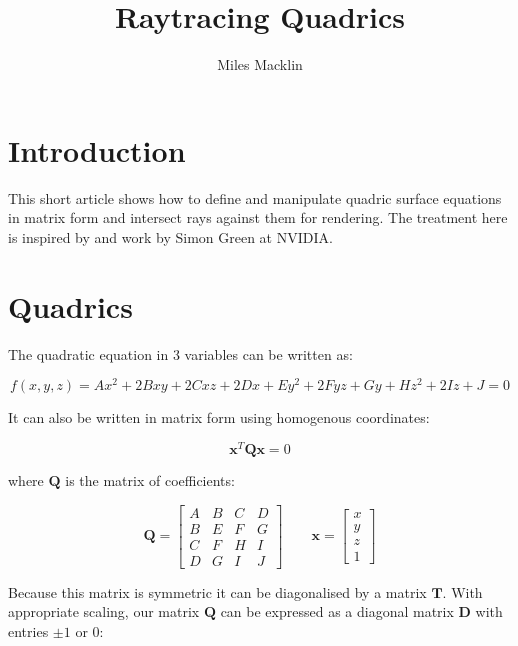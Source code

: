 \documentclass[11pt]{article}
\title{Raytracing Quadrics}
\author{Miles Macklin}
\renewcommand{\v}[1]{\ensuremath{\mathbf{#1}}} %
\begin{document}
\maketitle

\section{Introduction}

This short article shows how to define and manipulate quadric surface equations in matrix form and intersect rays against them for rendering. The treatment here is inspired by \cite{Sigg:2006:GRQ:2386388.2386396} and work by Simon Green at NVIDIA.


\section{Quadrics}

The quadratic equation in 3 variables can be written as:

\begin{equation}
f(x,y,z) = Ax^2 +2Bxy+2Cxz+2Dx+Ey^2+2Fyz+Gy+Hz^2 +2Iz+J = 0
\end{equation}

It can also be written in matrix form using homogenous coordinates:

\begin{equation}
\v{x}^T\v{Q}\v{x} = 0
\end{equation}

where $\v{Q}$ is the matrix of coefficients:

\begin{equation}
\v{Q} = 
\begin{bmatrix}
  A & B & C & D \\
  B & E & F & G \\
  C & F & H & I \\
  D & G & I & J
 \end{bmatrix}
 \qquad 
  \v{x} =
 \begin{bmatrix}
 x \\ y \\ z \\ 1
 \end{bmatrix}
\end{equation}

Because this matrix is symmetric it can be diagonalised by a matrix $\v{T}$. With appropriate scaling, our matrix $\v{Q}$ can be expressed as a diagonal matrix $\v{D}$ with entries $\pm 1$ or $0$:
\end{document}
